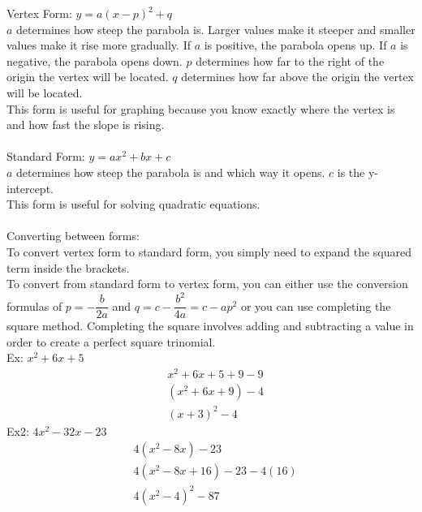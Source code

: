 Vertex Form: $y=a(x-p)^2+q$\\
$a$ determines how steep the parabola is. Larger values make it steeper and smaller values make it rise more gradually. If $a$ is positive, the parabola opens up. If $a$ is negative, the parabola opens down. $p$ determines how far to the right of the origin the vertex will be located. $q$ determines how far above the origin the vertex will be located.\\
This form is useful for graphing because you know exactly where the vertex is and how fast the slope is rising.\\
\\
Standard Form: $y=ax^2+bx+c$\\
$a$ determines how steep the parabola is and which way it opens. $c$ is the y-intercept.\\
This form is useful for solving quadratic equations.\\
\\
Converting between forms:\\
To convert vertex form to standard form, you simply need to expand the squared term inside the brackets.\\
To convert from standard form to vertex form, you can either use the conversion formulas of $p=-\dfrac{b}{2a}$ and $q=c-\dfrac{b^2}{4a}=c-ap^2$ or you can use completing the square method. Completing the square involves adding and subtracting a value in order to create a perfect square trinomial.\\
Ex: $x^2+6x+5$
\begin{align*}
    &x^2+6x+5+9-9\\
    &(x^2+6x+9)-4\\
    &(x+3)^2-4
\end{align*}
Ex2: $4x^2-32x-23$
\begin{align*}
    &4(x^2-8x)-23\\
    &4(x^2-8x+16)-23-4(16)\\
    &4(x^2-4)^2-87
\end{align*}

